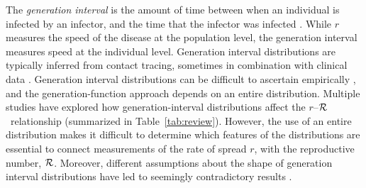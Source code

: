 \documentclass[12pt]{article}
\newcommand{\rR}{\mbox{$r$--$\cal R$}}
\newcommand{\RR}{\ensuremath{{\cal R}}}
\newcommand{\tref}[1]{Table~\ref{tab:#1}}
\begin{document}
The \emph{generation interval} is the amount of time between when an individual is infected by an infector, and the time that the infector was infected \cite{Sven07}.
While $r$ measures the speed of the disease at the population level, the generation interval measures speed at the individual level.
Generation interval distributions are typically inferred from contact tracing, sometimes in combination with clinical data \cite{AylwBarb14,LessOtt16,HubeJohn16}.
Generation interval distributions can be difficult to ascertain empirically \cite{NishCast09,ChamDush15}, and the generation-function approach depends on an entire distribution.
Multiple studies have explored how generation-interval distributions affect the \rR\ relationship (summarized in \tref{review}).
However, the use of an entire distribution makes it difficult to determine which features of the distributions are essential to connect measurements of the rate of spread $r$, with the reproductive number, \RR.
Moreover,  different assumptions about the shape of generation interval distributions have led to seemingly contradictory results \cite{wearing2005appropriate, roberts2007model}.
\end{document}
